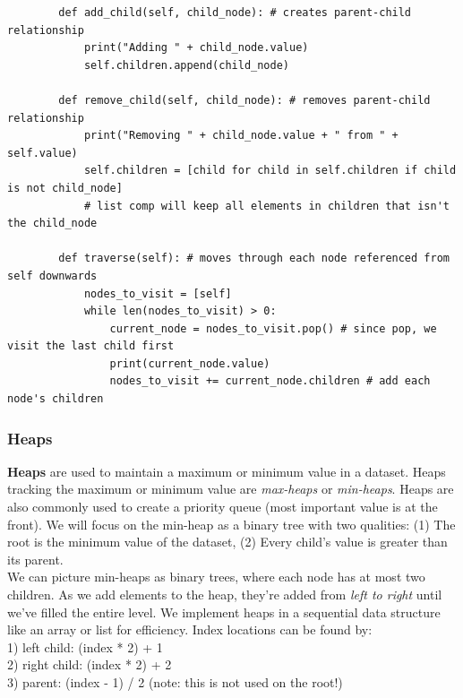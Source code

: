 \documentclass[11pt, a4paper]{article}
\begin{document}
\begin{spacing}{1.1}
\begin{lstlisting}
		def add_child(self, child_node): # creates parent-child relationship
			print("Adding " + child_node.value)
			self.children.append(child_node) 
		
		def remove_child(self, child_node): # removes parent-child relationship
			print("Removing " + child_node.value + " from " + self.value)
			self.children = [child for child in self.children if child is not child_node]
			# list comp will keep all elements in children that isn't the child_node 
		
		def traverse(self): # moves through each node referenced from self downwards
			nodes_to_visit = [self]
			while len(nodes_to_visit) > 0:
				current_node = nodes_to_visit.pop() # since pop, we visit the last child first
				print(current_node.value)
				nodes_to_visit += current_node.children # add each node's children	\end{lstlisting} \vspace*{1mm} 
	\subsubsection{Heaps}
	\textbf{Heaps} are used to maintain a maximum or minimum value in a dataset. Heaps tracking the maximum or minimum value are \textit{max-heaps} or \textit{min-heaps}. Heaps are also commonly used to create a priority queue (most important value is at the front). We will focus on the min-heap as a binary tree with two qualities: (1) The root is the minimum value of the dataset, (2) Every child’s value is greater than its parent. \vspace*{2mm} \\
	We can picture min-heaps as binary trees, where each node has at most two children. As we add elements to the heap, they’re added from \textit{left to right} until we’ve filled the entire level. We implement heaps in a sequential data structure like an array or list for efficiency. Index locations can be found by: \\
	\hspace*{2mm} 1) left child: (index * 2) + 1 \\
	\hspace*{2mm} 2) right child: (index * 2) + 2\\
	\hspace*{2mm} 3) parent: (index - 1) / 2 \hspace*{5mm} (note: this is not used on the root!) \newpage
	

\end{spacing}
\end{document}
